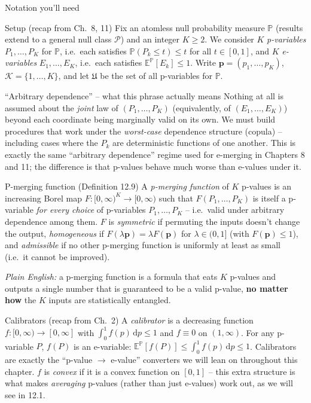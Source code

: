 \documentclass[aspectratio=169,10pt]{beamer}
\newcommand{\PP}{\mathbb{P}}
\newcommand{\EE}{\mathbb{E}}
\newcommand{\calP}{\mathcal{P}}
\newcommand{\calK}{\mathcal{K}}
\newcommand{\calU}{\mathfrak{U}}
\newcommand{\bp}{\mathbf{p}}
\begin{document}
\begin{frame}[allowframebreaks]{Notation you'll need}
  \begin{block}{Setup (recap from Ch.\ 8, 11)}
    Fix an atomless null probability measure $\PP$ (results extend to a general null class $\calP$) and an integer $K\ge2$. We consider $K$ \emph{p-variables} $P_1,\dots,P_K$ for $\PP$, i.e.\ each satisfies $\PP(P_k\le t)\le t$ for all $t\in[0,1]$, and $K$ \emph{e-variables} $E_1,\dots,E_K$, i.e.\ each satisfies $\EE^\PP[E_k]\le1$. Write $\bp=(p_1,\dots,p_K)$, $\calK=\{1,\dots,K\}$, and let $\calU$ be the set of all p-variables for $\PP$.
  \end{block}

  \begin{block}{``Arbitrary dependence'' -- what this phrase actually means}
    Nothing at all is assumed about the \emph{joint} law of $(P_1,\dots,P_K)$ (equivalently, of $(E_1,\dots,E_K)$) beyond each coordinate being marginally valid on its own. We must build procedures that work under the \emph{worst-case} dependence structure (copula) -- including cases where the $P_k$ are deterministic functions of one another. This is exactly the same ``arbitrary dependence'' regime used for e-merging in Chapters 8 and 11; the difference is that p-values behave much worse than e-values under it.
  \end{block}

  \begin{block}{P-merging function (Definition 12.9)}
    A \emph{p-merging function} of $K$ p-values is an increasing Borel map $F:[0,\infty)^K\to[0,\infty)$ such that $F(P_1,\dots,P_K)$ is itself a p-variable \emph{for every choice} of p-variables $P_1,\dots,P_K$ -- i.e.\ valid under arbitrary dependence among them. $F$ is \emph{symmetric} if permuting the inputs doesn't change the output, \emph{homogeneous} if $F(\lambda\bp)=\lambda F(\bp)$ for $\lambda\in(0,1]$ (with $F(\bp)\le1$), and \emph{admissible} if no other p-merging function is uniformly at least as small (i.e.\ it cannot be improved).

    \emph{Plain English:} a p-merging function is a formula that eats $K$ p-values and outputs a single number that is guaranteed to be a valid p-value, \textbf{no matter how} the $K$ inputs are statistically entangled.
  \end{block}

  \framebreak

  \begin{block}{Calibrators (recap from Ch.\ 2)}
    A \emph{calibrator} is a decreasing function $f:[0,\infty)\to[0,\infty]$ with $\int_0^1 f(p)\,\mathrm{d}p\le1$ and $f\equiv0$ on $(1,\infty)$. For any p-variable $P$, $f(P)$ is an e-variable: $\EE^\PP[f(P)]\le\int_0^1 f(p)\,\mathrm{d}p\le1$. Calibrators are exactly the ``p-value $\to$ e-value'' converters we will lean on throughout this chapter. $f$ is \emph{convex} if it is a convex function on $[0,1]$ -- this extra structure is what makes \emph{averaging} p-values (rather than just e-values) work out, as we will see in 12.1.
  \end{block}


\end{frame}
\end{document}
